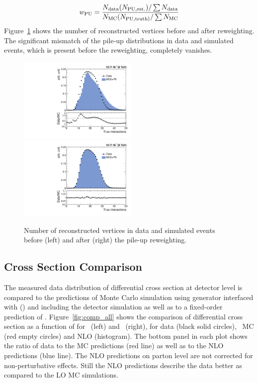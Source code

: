 \begin{equation}
 {w_{\rm PU} = \frac {N_{\rm data} (N_{\rm PU,est.})/\sum N_{\rm data}} {N_{\rm MC} (N_{\rm PU,truth)}/\sum N_{\rm MC}}}
\end{equation}
Figure~\ref{fig:pileup} shows the number of reconstructed vertices before and after reweighting. The significant mismatch of the pile-up distributions in data and simulated events, which is present before the reweighting, completely vanishes. 

\begin{figure}[!htbp]
 \begin{center}
 \includegraphics[width=0.51\textwidth]{Plots_HT_2_150/Nvertices.pdf}%
 ~~\includegraphics[width=0.51\textwidth]{Plots_HT_2_150/Nvertices_weight.pdf}
 \caption{Number of reconstructed vertices in data and simulated events before (left) and after (right) the pile-up reweighting.}
 \label{fig:pileup}
 \end{center}
\end{figure}

\subsection{Cross Section Comparison}
The measured data distribution of differential cross section at detector level is compared to the predictions of Monte Carlo simulation using \MadGraphF generator interfaced with \PYTHIAS (\MGP) and including the detector simulation as well as to a fixed-order prediction of \NLOJETPP. Figure~\ref{fig:comp_all} shows the comparison of differential cross section as a function of \httwo for \njt~(left) and \njth~(right), for data (black solid circles), \MGP~MC (red empty circles) and NLO (histogram). The bottom panel in each plot shows the ratio of data to the MC predictions (red line) as well as to the NLO predictions (blue line). The NLO predictions on parton level are not corrected for non-perturbative effects. Still the NLO predictions describe the data better as compared to the LO MC simulations.

